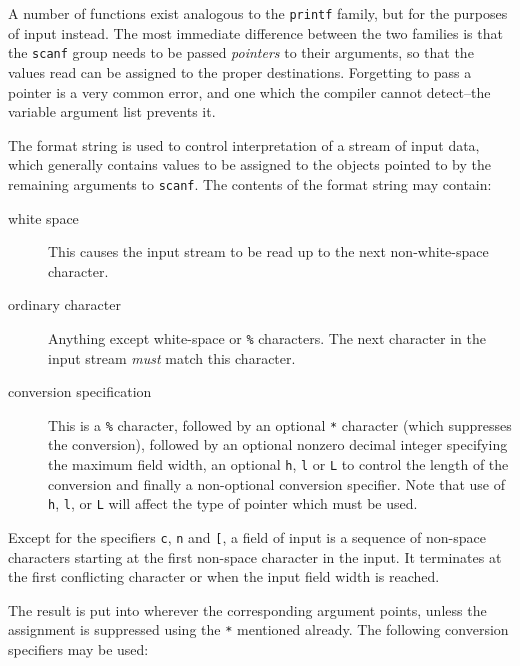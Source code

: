    A number of functions exist analogous to the \texttt{printf} family,
    but for the purposes of input instead.  The most immediate difference
    between the two families is that the \texttt{scanf} group needs to be
    passed \textit{pointers} to their arguments, so that the values read can be
    assigned to the proper destinations.  Forgetting to pass a pointer is
    a very common error, and one which the compiler cannot detect--the
    variable argument list prevents it.


   The format string is used to control interpretation of a stream of input
    data, which generally contains values to be assigned to the objects pointed
    to by the remaining arguments to \texttt{scanf}.  The contents of the
    format string may contain:


   \begin{description}
    \item[white space] This causes the input stream to be read up to the next
     non-white-space character.

    \item[ordinary character] Anything except white-space or \texttt{\%} characters.  The next
     character in the input stream \textit{must} match this character.

    \item[conversion specification] This is a \texttt{\%} character, followed by an optional
     \texttt{*} character (which suppresses the conversion), followed by
     an optional nonzero decimal integer specifying the maximum field width,
     an optional \texttt{h}, \texttt{l} or \texttt{L} to control
     the length of the conversion and finally a non-optional conversion
     specifier.  Note that use of \texttt{h}, \texttt{l}, or
     \texttt{L} will affect the type of pointer which must be used.
   \end{description}

   Except for the specifiers \texttt{c}, \texttt{n} and
    \texttt{[}, a field of input is a sequence of non-space characters
    starting at the first non-space character in the input.  It terminates at
    the first conflicting character or when the input field width is
    reached.


   The result is put into wherever the corresponding argument points, unless
    the assignment is suppressed using the \texttt{*} mentioned already.
    The following conversion specifiers may be used:


